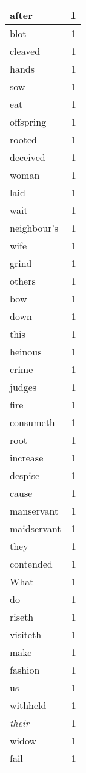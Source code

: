 \begin{center}
\begin{longtable}{l|r}
after & 1 \\ \hline
blot & 1 \\ \hline
cleaved & 1 \\ \hline
hands & 1 \\ \hline
sow & 1 \\ \hline
eat & 1 \\ \hline
offspring & 1 \\ \hline
rooted & 1 \\ \hline
deceived & 1 \\ \hline
woman & 1 \\ \hline
laid & 1 \\ \hline
wait & 1 \\ \hline
neighbour's & 1 \\ \hline
wife & 1 \\ \hline
grind & 1 \\ \hline
others & 1 \\ \hline
bow & 1 \\ \hline
down & 1 \\ \hline
this & 1 \\ \hline
heinous & 1 \\ \hline
crime & 1 \\ \hline
judges & 1 \\ \hline
fire & 1 \\ \hline
consumeth & 1 \\ \hline
root & 1 \\ \hline
increase & 1 \\ \hline
despise & 1 \\ \hline
cause & 1 \\ \hline
manservant & 1 \\ \hline
maidservant & 1 \\ \hline
they & 1 \\ \hline
contended & 1 \\ \hline
What & 1 \\ \hline
do & 1 \\ \hline
riseth & 1 \\ \hline
visiteth & 1 \\ \hline
make & 1 \\ \hline
fashion & 1 \\ \hline
us & 1 \\ \hline
withheld & 1 \\ \hline
\emph{their} & 1 \\ \hline
widow & 1 \\ \hline
fail & 1 \\ \hline

\end{longtable}
\end{center}
